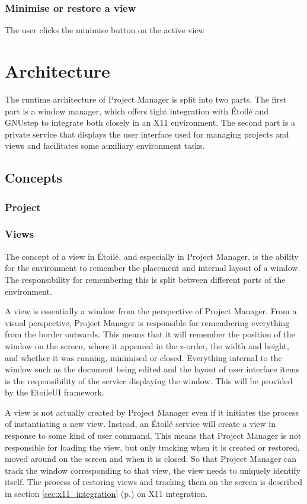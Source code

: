 \documentclass[11pt]{report}
\newcommand{\etoile}{\'Etoil\'e\xspace}
\newcommand{\proman}{Project Manager\xspace}
\begin{document}
\subsection{Minimise or restore a view}
The user clicks the minimise button on the active view

\chapter{Architecture}

The runtime architecture of Project Manager is split into two parts. The first part is a window manager, which offers tight integration with \etoile and GNUstep to integrate both closely in an X11 environment. The second part is a private service that displays the user interface used for managing projects and views and facilitates some auxiliary environment tasks.

\section{Concepts}
\subsection{Project}

\subsection{Views}
The concept of a view in \etoile, and especially in Project Manager, is the ability for the environment to remember the placement and internal layout of a window. The responsibility for remembering this is split between different parts of the environment.

A view is essentially a window from the perspective of \proman. From a visual perspective, \proman is responsible for remembering everything from the border outwards. This means that it will remember the position of the window on the screen, where it appeared in the z-order, the width and height, and whether it was running, minimised or closed. Everything internal to the window such as the document being edited and the layout of user interface items is the responsibility of the service displaying the window. This will be provided by the EtoileUI framework.

A view is not actually created by \proman even if it initiates the process of instantiating a new view. Instead, an \etoile service will create a view in response to some kind of user command. This means that \proman is not responsible for loading the view, but only tracking when it is created or restored, moved around on the screen and when it is closed. So that \proman can track the window corresponding to that view, the view needs to uniquely identify itself. The process of restoring views and tracking them on the screen is described in section \ref{sec:x11_integration} (p.\pageref{sec:x11_integration}) on X11 integration.
\end{document}
